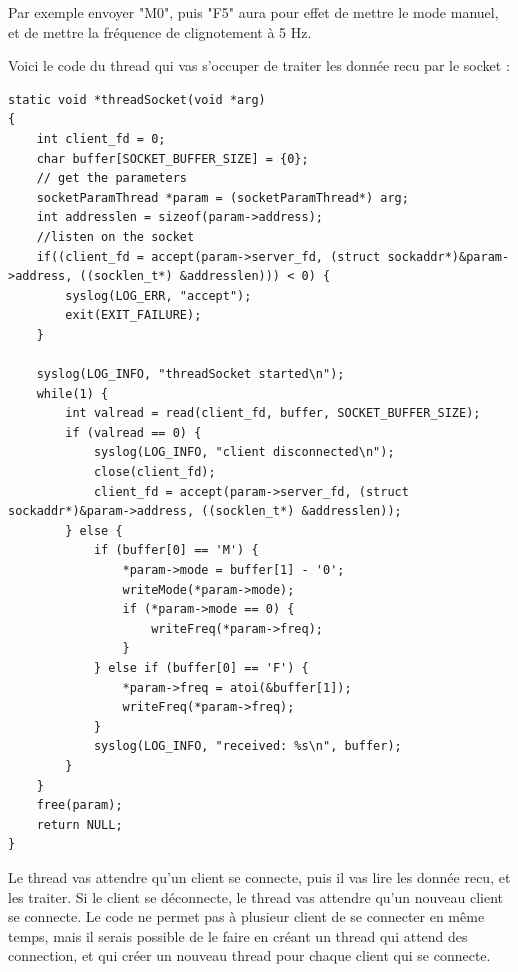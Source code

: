 \documentclass[
	a4paper, %
	10pt, %
]{CSUniSchoolLabReport}
\begin{document}
Par exemple envoyer "M0", puis "F5" aura pour effet de mettre le mode manuel, et de mettre la fréquence de clignotement à 5 Hz.

Voici le code du thread qui vas s'occuper de traiter les donnée recu par le socket : \\
\begin{lstlisting}[style=CStyle]
static void *threadSocket(void *arg)
{
	int client_fd = 0;
	char buffer[SOCKET_BUFFER_SIZE] = {0};
	// get the parameters
	socketParamThread *param = (socketParamThread*) arg;
	int addresslen = sizeof(param->address);
	//listen on the socket
	if((client_fd = accept(param->server_fd, (struct sockaddr*)&param->address, ((socklen_t*) &addresslen))) < 0) {
		syslog(LOG_ERR, "accept");
		exit(EXIT_FAILURE);
	}

	syslog(LOG_INFO, "threadSocket started\n");
	while(1) {
		int valread = read(client_fd, buffer, SOCKET_BUFFER_SIZE);
		if (valread == 0) {
			syslog(LOG_INFO, "client disconnected\n");
			close(client_fd);
			client_fd = accept(param->server_fd, (struct sockaddr*)&param->address, ((socklen_t*) &addresslen));
		} else {
			if (buffer[0] == 'M') {
				*param->mode = buffer[1] - '0';
				writeMode(*param->mode);
				if (*param->mode == 0) {
					writeFreq(*param->freq);
				}
			} else if (buffer[0] == 'F') {
				*param->freq = atoi(&buffer[1]);
				writeFreq(*param->freq);
			}
			syslog(LOG_INFO, "received: %s\n", buffer);
		}
	}
	free(param);
	return NULL;
}
\end{lstlisting}
Le thread vas attendre qu'un client se connecte, puis il vas lire les donnée recu, et les traiter.
Si le client se déconnecte, le thread vas attendre qu'un nouveau client se connecte.
Le code ne permet pas à plusieur client de se connecter en même temps, mais il serais possible de le faire en créant un thread qui attend des connection, et qui créer un nouveau thread pour chaque client qui se connecte. \\
\end{document}
